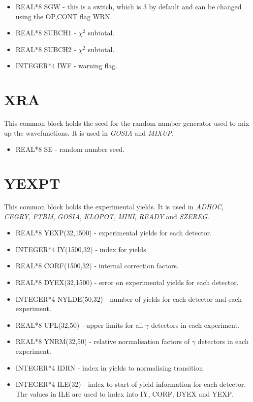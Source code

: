 \begin{itemize}
\item REAL*8 SGW - this is a switch, which is 3 by default and can be
changed using the OP,CONT flag WRN.
\item REAL*8 SUBCH1 - $\chi^2$ subtotal.
\item REAL*8 SUBCH2 - $\chi^2$ subtotal.
\item INTEGER*4 IWF - warning flag.
\end{itemize}

\section{XRA}

This common block holds the seed for the random number generator used to mix
up the wavefunctions. It is used in {\em GOSIA} and {\em MIXUP}.

\begin{itemize}
\item REAL*8 SE - random number seed.
\end{itemize}

\section{YEXPT}

This common block holds the experimental yields. It is used in {\em ADHOC},
{\em CEGRY}, {\em FTBM}, {\em GOSIA}, {\em KLOPOT}, {\em MINI}, {\em READY}
and {\em SZEREG}.

\begin{itemize}
\item REAL*8 YEXP(32,1500) - experimental yields for each detector.
\item INTEGER*4 IY(1500,32) - index for yields
\item REAL*8 CORF(1500,32) - internal correction factors.
\item REAL*8 DYEX(32,1500) - error on experimental yields for each detector.
\item INTEGER*4 NYLDE(50,32) - number of yields for each detector and each
experiment.
\item REAL*8 UPL(32,50) - upper limits for all $\gamma$ detectors in each
experiment.
\item REAL*8 YNRM(32,50) - relative normalisation factors of $\gamma$
detectors in each experiment.
\item INTEGER*4 IDRN - index in yields to normalising transition
\item INTEGER*4 ILE(32) - index to start of yield information for each
detector. The values in ILE are used to index into IY, CORF, DYEX and YEXP.
\end{itemize}

